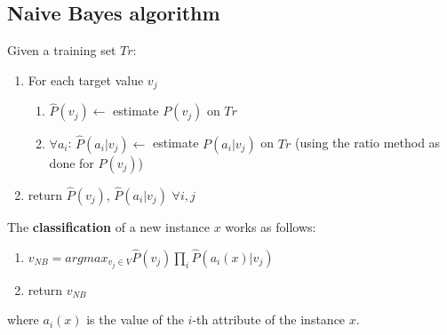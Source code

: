 \subsection{Naive Bayes algorithm}
Given a training set $Tr$:
\begin{enumerate}
    \item For each target value $v_{j}$
    \begin{enumerate}
        \item $\hat{P}(v_{j}) \leftarrow$ estimate $P(v_{j})$ on $Tr$
        \item $\forall a_{i}$: $\hat{P}(a_{i} | v_{j}) \leftarrow$ estimate $P(a_{i} | v_{j})$ on $Tr$ (using the ratio method as done for $P(v_{j})$)
    \end{enumerate}
    \item return $\hat{P}(v_{j})$, $\hat{P}(a_{i} | v_{j})$ $\forall i,j$
\end{enumerate}
The \textbf{classification} of a new instance $x$ works as follows:
\begin{enumerate}
    \item $v_{NB} = argmax_{v_{j} \in V}\hat{P}(v_{j})\prod_{i}\hat{P}(a_{i}(x) | v_{j})$
    \item return $v_{NB}$
\end{enumerate}
where $a_{i}(x)$ is the value of the $i$-th attribute of the instance $x$.

